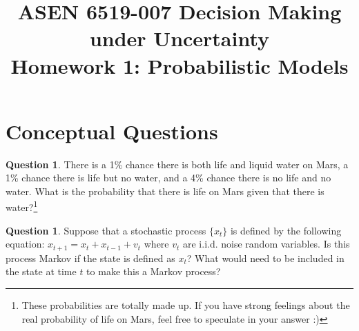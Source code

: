 \documentclass{article}
\title{ASEN 6519-007 Decision Making under Uncertainty\\
       Homework 1: Probabilistic Models}
\theoremstyle{definition}
\newtheorem{question}[thm]{Question}
\begin{document}
\maketitle

\section{Conceptual Questions}

\begin{question}
There is a 1\% chance there is both life and liquid water on Mars, a 1\% chance there is life but no
water, and a 4\% chance there is no life and no water. What is the probability that there is life on Mars given that there is water?\footnote{These probabilities are totally made up. If you have strong feelings about the real probability of life on Mars, feel free to speculate in your answer :)}
\end{question}

\begin{question}
    Suppose that a stochastic process $\{x_t\}$ is defined by the following equation: $x_{t+1} = x_t + x_{t-1} + v_{t}$ where $v_t$ are i.i.d. noise random variables. Is this process Markov if the state is defined as $x_t$? What would need to be included in the state at time $t$ to make this a Markov process?
\end{question}
\end{document}
